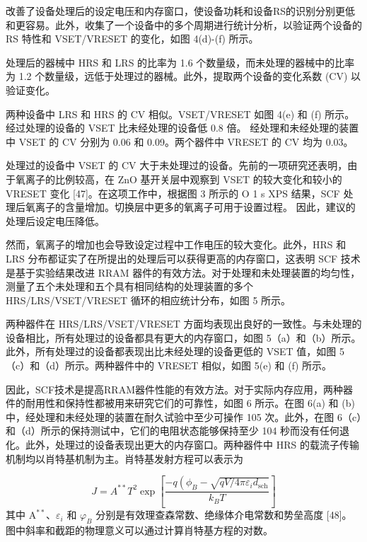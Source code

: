 改善了设备处理后的设定电压和内存窗口，使设备功耗和设备RS的识别分别更低和更容易。此外，收集了一个设备中的多个周期进行统计分析，以验证两个设备的 RS 特性和 VSET/VRESET 的变化，如图 4(d)-(f) 所示。

处理后的器械中 HRS 和 LRS 的比率为 1.6 个数量级，而未处理的器械中的比率为 1.2 个数量级，远低于处理过的器械。此外，提取两个设备的变化系数 (CV) 以验证变化。

两种设备中 LRS 和 HRS 的 CV 相似。VSET/VRESET 如图 4(e) 和 (f) 所示。经过处理的设备的 VSET 比未经处理的设备低 0.8 倍。
经处理和未经处理的装置中 VSET 的 CV 分别为 0.06 和 0.09。两个器件中 VRESET 的 CV 均为 0.03。

处理过的设备中 VSET 的 CV 大于未处理过的设备。先前的一项研究还表明，由于氧离子的比例较高，在 ZnO 基开关层中观察到 VSET 的较大变化和较小的 VRESET 变化 [47]。在这项工作中，根据图 3 所示的 O 1 s XPS 结果，SCF 处理后氧离子的含量增加。切换层中更多的氧离子可用于设置过程。
因此，建议的处理后设定电压降低。

然而，氧离子的增加也会导致设定过程中工作电压的较大变化。此外，HRS 和 LRS 分布都证实了在所提出的处理后可以获得更高的内存窗口，这表明 SCF 技术是基于实验结果改进 RRAM 器件的有效方法。对于处理和未处理装置的均匀性，测量了五个未处理和五个具有相同结构的处理装置的多个 HRS/LRS/VSET/VRESET 循环的相应统计分布，如图 5 所示。

两种器件在 HRS/LRS/VSET/VRESET 方面均表现出良好的一致性。与未处理的设备相比，所有处理过的设备都具有更大的内存窗口，如图 5（a）和（b）所示。此外，所有处理过的设备都表现出比未经处理的设备更低的 VSET 值，如图 5（c）和（d）所示。两种器件中的 VRESET 相似，如图 5(e) 和 (f) 所示。

因此，SCF技术是提高RRAM器件性能的有效方法。对于实际内存应用，两种器件的耐用性和保持性都被用来研究它们的可靠性，如图 6 所示。在图 6(a) 和 (b) 中，经处理和未经处理的装置在耐久试验中至少可操作 105 次。此外，在图 6（c）和（d）所示的保持测试中，它们的电阻状态能够保持至少 104 秒而没有任何退化。此外，处理过的设备表现出更大的内存窗口。两种器件中 HRS 的载流子传输机制均以肖特基机制为主。肖特基发射方程可以表示为

$$
J=A^{* *} T^2 \exp \left[\frac{-q\left(\phi_B-\sqrt{q V / 4 \pi \varepsilon_i d_{\mathrm{sch}}}\right.}{k_B T}\right]
$$
其中 $\mathrm{A}^{* *}$、$\varepsilon_i$ 和 $\varphi_B$ 分别是有效理查森常数、绝缘体介电常数和势垒高度 [48]。
图中斜率和截距的物理意义可以通过计算肖特基方程的对数。


